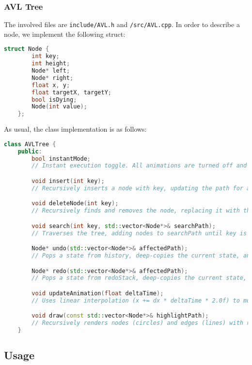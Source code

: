\documentclass{article}
\begin{document}
\subsubsection{AVL Tree}
The involved files are \lstinline|include/AVL.h| and \lstinline|/src/AVL.cpp|. In order to describe a node, we implement the following struct:
\begin{lstlisting}[language=c++]
	struct Node {
		int key;
		int height;
		Node* left;
		Node* right;
		float x, y;
		float targetX, targetY;
		bool isDying;
		Node(int value);
	};
\end{lstlisting}
As usual, the class implementation is as follows:
\begin{lstlisting}[language=c++]
	class AVLTree {
	public:
		bool instantMode;
		// Instant execution toggle. All animations are turned off and nodes are immediately present at their positions.

		void insert(int key);
		// Recursively inserts a node with key, updating the path for animation. Balances the tree using AVL rotations if the balance factor (getHeight(left) - getHeight(right)) exceeds 1 or -1.

		void deleteNode(int key);
		// Recursively finds and removes the node, replacing it with the minimum of the right subtree if it has two children, then rebalances.

		void search(int key, std::vector<Node*>& searchPath);
		// Traverses the tree, adding nodes to searchPath until key is found or traversal ends.

		Node* undo(std::vector<Node*>& affectedPath);
		// Pops a state from history, deep-copies the current state, and restores the previous state.

		Node* redo(std::vector<Node*>& affectedPath);
		// Pops a state from redoStack, deep-copies the current state, and restores the next state.

		void updateAnimation(float deltaTime);
		// Uses linear interpolation (x += dx * deltaTime * 2.0f) to move nodes from current (x, y) to target positions (targetX, targetY).

		void draw(const std::vector<Node*>& highlightPath);
		// Recursively renders nodes (circles) and edges (lines) with raylib, highlighting nodes in highlightPath.
	}
\end{lstlisting}

\subsection{Usage}
\end{document}
